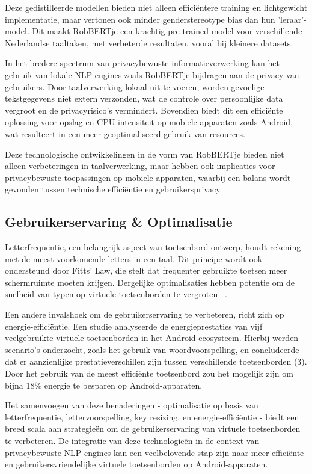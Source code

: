 Deze gedistilleerde modellen bieden niet alleen efficiëntere training en lichtgewicht implementatie, maar vertonen ook minder genderstereotype bias dan hun 'leraar'-model. Dit maakt RobBERTje een krachtig pre-trained model voor verschillende Nederlandse taaltaken, met verbeterde resultaten, vooral bij kleinere datasets. ~\autocite{Delobelle2022}

In het bredere spectrum van privacybewuste informatieverwerking kan het gebruik van lokale NLP-engines zoals RobBERTje bijdragen aan de privacy van gebruikers. Door taalverwerking lokaal uit te voeren, worden gevoelige tekstgegevens niet extern verzonden, wat de controle over persoonlijke data vergroot en de privacyrisico's vermindert. Bovendien biedt dit een efficiënte oplossing voor opslag en CPU-intensiteit op mobiele apparaten zoals Android, wat resulteert in een meer geoptimaliseerd gebruik van resources.

Deze technologische ontwikkelingen in de v\-orm van RobBERTje bieden niet alleen verbeteringen in taalverwerking, maar hebben ook implicaties voor privacybewuste toepassingen op mobiele apparaten, waarbij een balans wordt gevonden tussen technische efficiëntie en gebruikersprivacy.

\subsection{Gebruikerservaring \& Optimalisatie}

Letterfrequentie, een belangrijk aspect van t\-oe\-ts\-enbord ontwerp, houdt rekening met de m\-ee\-st voorkomende letters in een taal. Dit principe wordt ook ondersteund door Fitts' Law, die stelt dat frequenter gebruikte toetsen meer schermruimte moeten krijgen. Dergelijke optimalisaties hebben potentie om de snelheid van typen op virtuele toetsenborden te vergroten ~\autocite{Gelormini2013}.

Een andere invalshoek om de gebruikerservaring te verbeteren, richt zich op energie-efficiëntie. Een studie analyseerde de energieprestaties van vijf veelgebruikte virtuele toetsenborden in het Android-ecosysteem. Hierbij werden scenario's onderzocht, zoals het gebruik van woordvoorspelling, en concludeerde dat er aanzienlijke prestatieverschillen zijn tussen verschillende toetsenborden (3). Door het gebruik van de meest efficiënte toetsenbord zou het mogelijk zijn om bijna 18\% energie te besparen op Android-apparaten. ~\autocite{Rua2020}

Het samenvoegen van deze benaderingen - optimalisatie op basis van letterfrequentie, lettervoorspelling, key resizing, en energie-efficiëntie - biedt een breed scala aan strategieën om de gebruikerservaring van virtuele toetsenborden te verbeteren. De integratie van deze technologieën in de context van privacybewuste NLP-engines kan een veelbelovende stap zijn naar meer efficiënte en gebruikersvriendelijke virtuele toetsenborden op Android-apparaten.

